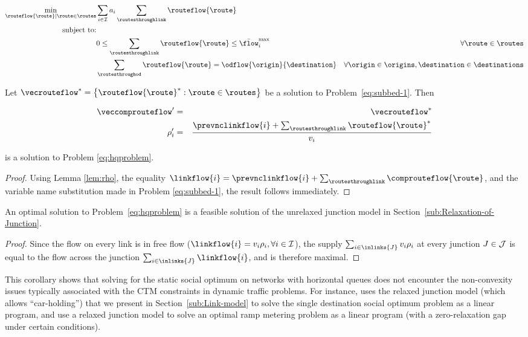 \begin{eqnarray}
\min_{\routeflow{\route}|\route\in\routes} & \sum_{\link\in\links}a_{\link}\sum_{\routesthroughlink}\routeflow{\route}\label{eq:subbed-1}\\
\text{subject to:}\nonumber \\
 & 0\le\sum_{\routesthroughlink}\routeflow{\route}\le\bar{\flow}_{\link}^{\max} & \forall\route\in\routes\nonumber \\
 & \sum_{\routesthroughod}\routeflow{\route}=\odflow{\origin}{\destination} & \forall\origin\in\origins,\destination\in\destinations\nonumber 
\end{eqnarray}

\begin{lem}
\label{lem:main}Let $\vecrouteflow^{*}=\left\{ \routeflow{\route}^{*}:\route\in\routes\right\} $
be a solution to Problem~\eqref{eq:subbed-1}. Then

\begin{eqnarray*}
\veccomprouteflow' & = & \vecrouteflow^{*}\\
\density'_{\link} & = & \frac{\prevnclinkflow{\link}+\sum_{\routesthroughlink}\routeflow{\route}^{*}}{\ffspeed_{\link}}
\end{eqnarray*}


is a solution to Problem \eqref{eq:hqproblem}.\end{lem}
\begin{proof}
Using Lemma \ref{lem:rho}, the equality $\linkflow{\link}=\prevnclinkflow{\link}+\sum_{\routesthroughlink}\comprouteflow{\route}$,
and the variable name substitution made in Problem \ref{eq:subbed-1},
the result follows immediately.\end{proof}
\begin{cor}
\label{cor:An-optimal-solution}An optimal solution to Problem~\eqref{eq:hqproblem}
is a feasible solution of the unrelaxed junction model in Section~\ref{sub:Relaxation-of-Junction}.\end{cor}
\begin{proof}
Since the flow on every link is in free flow ($\linkflow{\link}=\ffspeed_{\link}\density_{\link},\forall\link\in\links$),
the supply $\sum_{\link\in\inlinks{\junction}}\ffspeed_{\link}\density_{\link}$
at every junction $J\in\mathcal{J}$ is equal to the flow across
the junction $\sum_{\link\in\inlinks{\junction}}\linkflow{\link}$,
and is therefore maximal.
\end{proof}
This corollary shows that solving for the static social optimum on
networks with horizontal queues does not encounter the non-convexity
issues typically associated with the CTM constraints in dynamic traffic
problems. For instance, \cite{ziliaskopoulos2000linear} uses the
relaxed junction model (which allows ``car-holding'') that we present
in Section~\ref{sub:Link-model} to solve the single destination
social optimum problem as a linear program, and \cite{gomes2006optimal}
use a relaxed junction model to solve an optimal ramp metering problem
as a linear program (with a zero-relaxation gap under certain conditions).


